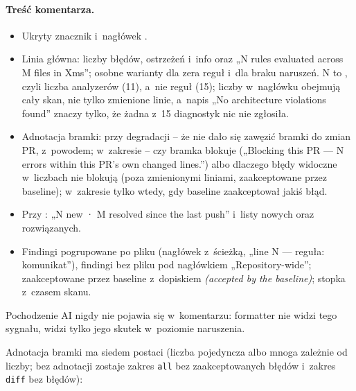 \paragraph{Treść komentarza.}
\begin{itemize}[leftmargin=*]
  \item Ukryty znacznik  i~nagłówek
        .
  \item Linia główna: liczby błędów, ostrzeżeń i~info oraz „N rules evaluated across M files
        in Xms”; osobne warianty dla zera reguł i~dla braku naruszeń. N to
        , czyli liczba analyzerów (11), a~nie reguł (15); liczby
        w~nagłówku obejmują cały skan, nie tylko zmienione linie, a~napis „No architecture
        violations found” znaczy tylko, że żadna z~15 diagnostyk nic nie zgłosiła.
  \item Adnotacja bramki: przy degradacji -- że nie dało się zawęzić bramki do zmian PR,
        z~powodem; w~zakresie  -- czy bramka blokuje („Blocking this PR —
        N errors within this PR's own changed lines.”) albo dlaczego błędy widoczne w~liczbach
        nie blokują (poza zmienionymi liniami, zaakceptowane przez baseline); w~zakresie
         tylko wtedy, gdy baseline zaakceptował jakiś błąd.
  \item Przy : „N new · M resolved since the last push” i~listy
        nowych oraz rozwiązanych.
  \item Findingi pogrupowane po pliku (nagłówek z~ścieżką, „line N — reguła: komunikat”),
        findingi bez pliku pod nagłówkiem „Repository-wide”; zaakceptowane przez baseline
        z~dopiskiem \emph{(accepted by the baseline)}; stopka z~czasem skanu.
\end{itemize}
Pochodzenie AI nigdy nie pojawia się w~komentarzu: formatter nie widzi tego sygnału, widzi
tylko jego skutek w~poziomie naruszenia.

Adnotacja bramki ma siedem postaci (liczba pojedyncza albo mnoga zależnie od liczby; bez
adnotacji zostaje zakres \texttt{all} bez zaakceptowanych błędów i~zakres \texttt{diff} bez
błędów):

